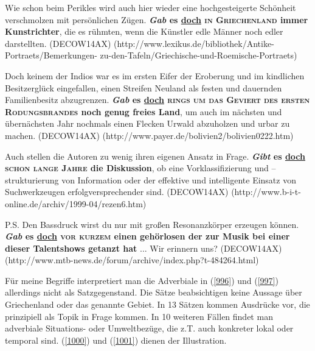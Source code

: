 {\begin{exe}
	\ex\label{996} 
	\scriptsize
	Wie schon beim Perikles wird auch hier wieder eine hochgesteigerte Schönheit verschmolzen mit persönlichen Zügen. \textbf{\textit{Gab} es 					\underline{doch} \textsc{in Griechenland} immer Kunstrichter}, die es rühmten, wenn die Künstler edle Männer noch edler darstellten.	 		
	\hfill\hbox {(DECOW14AX)}
	\newline
	\hbox{}\hfill\hbox{(http://www.lexikus.de/bibliothek/Antike-Portraets/Bemerkungen-}
	\newline
	\hbox{}\hfill\hbox{zu-den-Tafeln/Griechische-und-Roemische-Portraets)}
\end{exe}

\begin{exe}
	\ex\label{997} 
	\scriptsize
	Doch keinem der Indios war es im ersten Eifer der Eroberung und im kindlichen Besitzerglück eingefallen, einen Streifen Neuland als festen und 				dauernden Familienbesitz abzugrenzen. \textbf{\textit{Gab} es \underline{doch} \textsc{rings um das Geviert des ersten Rodungsbrandes} noch genug 			freies Land}, um auch im nächsten und übernächsten Jahr nochmals einen Flecken Urwald abzuholzen und urbar zu machen.	
	\newline 		
	\hbox{}\hfill\hbox {(DECOW14AX)}
	\newline
	\hbox{}\hfill\hbox{(http://www.payer.de/bolivien2/bolivien0222.htm)}
\end{exe}	
	
\begin{exe}
	\ex\label{998} 
	\scriptsize
	Auch stellen die Autoren zu wenig ihren eigenen Ansatz in Frage. \textbf{\textit{Gibt} es \underline{doch} \textsc{schon lange Jahre} die Diskussion}, 		ob eine Vorklassifizierung und 	–strukturierung von Information oder der effektive und intelligente Einsatz von Suchwerkzeugen erfolgversprechender 		sind.	 		
	\hfill\hbox {(DECOW14AX)}
	\newline
	\hbox{}\hfill\hbox{(http://www.b-i-t-online.de/archiv/1999-04/rezen6.htm)}
\end{exe}								                  

\begin{exe}
	\ex\label{999} 
	\scriptsize
	P.S. Den Bassdruck wirst du nur mit großen Resonanzkörper erzeugen können. \textbf{\textit{Gab} es \underline{doch} \textsc{vor kurzem} einen 				gehörlosen der zur 	Musik bei einer dieser Talentshows getanzt hat} ... Wir erinnern uns? 	 		
	\hfill\hbox {(DECOW14AX)}
	\newline
	\hbox{}\hfill\hbox{(http://www.mtb-news.de/forum/archive/index.php?t-484264.html)}
\end{exe}				                    
Für meine Begriffe interpretiert man die Adverbiale in (\ref{996}) und (\ref{997}) allerdings nicht als Satzgegenstand. Die Sätze beabsichtigen keine Aussage über Griechenland oder das genannte Gebiet. In 13 Sätzen kommen Ausdrücke vor, die prinzi\-piell als Topik  in Frage kommen. In 10 weiteren Fällen findet man adverbiale Situations- oder Umweltbezüge, die z.T. auch konkreter lokal oder temporal sind. (\ref{1000}) und (\ref{1001}) dienen der Illustration.

}
